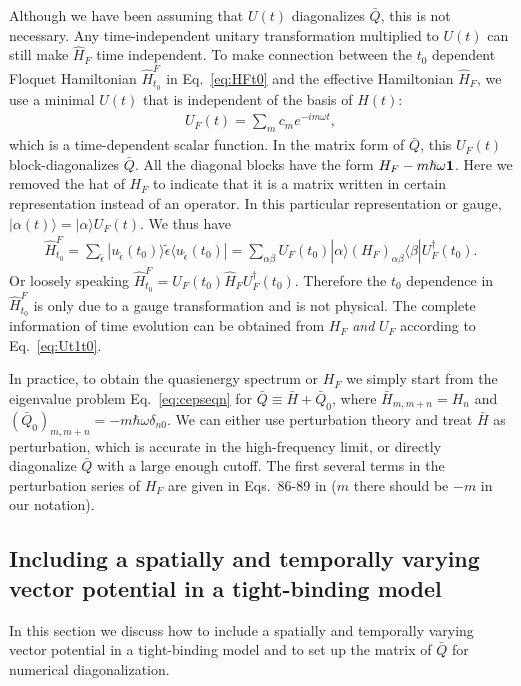 \documentclass[aps,pra,preprint,showpacs]{revtex4-1}
\begin{document}
Although we have been assuming that $U(t)$ diagonalizes $\bar{Q}$, this is not necessary. Any time-independent unitary transformation multiplied to $U(t)$ can still make $\hat{H}_F$ time independent. To make connection between the $t_0$ dependent Floquet Hamiltonian $\hat{H}^F_{t_0}$ in Eq.~\ref{eq:HFt0} and the effective Hamiltonian $\hat{H}_F$, we use a minimal $U(t)$ that is independent of the basis of $\hat{H}(t)$:
\begin{eqnarray}
	U_F(t) =\sum_m c_m e^{-im\omega t}, 
\end{eqnarray}
which is a time-dependent scalar function. In the matrix form of $\bar{Q}$, this $U_F(t)$ block-diagonalizes $\bar{Q}$. All the diagonal blocks have the form $H_F - m\hbar \omega \bf{1}$. Here we removed the hat of $H_F$ to indicate that it is a matrix written in certain representation instead of an operator. In this particular representation or gauge, $|\alpha(t)\rangle = |\alpha\rangle U_F(t)$. We thus have
\begin{eqnarray}
	\hat{H}_{t_0}^F = \sum_{\tilde{\epsilon}}|u_{\tilde{\epsilon}}(t_0)\rangle \tilde{\epsilon} \langle u_{\tilde{\epsilon}} (t_0)| = \sum_{\alpha\beta} U_F(t_0) |\alpha\rangle (H_F)_{\alpha\beta} \langle \beta | U_F^\dag(t_0).  
\end{eqnarray}  
Or loosely speaking $\hat{H}_{t_0}^F =  U_F(t_0) \hat{H}_F U_F^\dag(t_0)$. Therefore the $t_0$ dependence in $\hat{H}_{t_0}^F$ is only due to a gauge transformation and is not physical. The complete information of time evolution can be obtained from $H_F$ \emph{and} $U_F$ according to Eq.~\ref{eq:Ut1t0}.

In practice, to obtain the quasienergy spectrum or $H_F$ we simply start from the eigenvalue problem Eq.~\ref{eq:cepseqn} for $\bar{Q}\equiv \bar{H} + \bar{Q}_0$, where $\bar{H}_{m,m+n} = H_n$ and $(\bar{Q}_0)_{m,m+n} = -m\hbar \omega \delta_{n0}$. We can either use perturbation theory and treat $\bar{H}$ as perturbation, which is accurate in the high-frequency limit, or directly diagonalize $\bar{Q}$ with a large enough cutoff. The first several terms in the perturbation series of $H_F$ are given in Eqs.~86-89 in \cite{AEE} ($m$ there should be $-m$ in our notation). 

\subsection{Including a spatially and temporally varying vector potential in a tight-binding model}

In this section we discuss how to include a spatially and temporally varying vector potential in a tight-binding model and to set up the matrix of $\bar{Q}$ for numerical diagonalization.
\end{document}
